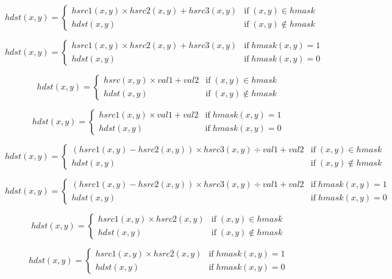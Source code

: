 \documentclass{article}
\begin{document}
{\[ hdst(x,y) = \left\{ \begin{array}{ll} hsrc1(x,y) \times hsrc2(x,y) + hsrc3(x, y) & \mathrm{if} \; (x,y) \in hmask \\ hdst(x,y) & \mathrm{if} \; (x,y) \notin hmask \end{array} \right. \]
\pagebreak

\[hdst(x,y) = \left\{ \begin{array}{ll} hsrc1(x,y) \times hsrc2(x,y) + hsrc3(x, y) & \mathrm{if} \; hmask(x,y) = 1 \\ hdst(x,y) & \mathrm{if} \; hmask(x,y) = 0 \end{array} \right. \]
\pagebreak

\[ hdst(x,y) = \left\{ \begin{array}{ll} hsrc(x,y) \times val1 + val2 & \mathrm{if} \; (x,y) \in hmask \\ hdst(x,y) & \mathrm{if} \; (x,y) \notin hmask \end{array} \right. \]
\pagebreak

\[hdst(x,y) = \left\{ \begin{array}{ll} hsrc1(x,y) \times val1 + val2 & \mathrm{if} \; hmask(x,y) = 1 \\ hdst(x,y) & \mathrm{if} \; hmask(x,y) = 0 \end{array} \right. \]
\pagebreak

\[ hdst(x,y) = \left\{ \begin{array}{ll} ( hsrc1(x,y) - hsrc2(x,y) ) \times hsrc3(x, y) \div val1 + val2 & \mathrm{if} \; (x,y) \in hmask \\ hdst(x,y) & \mathrm{if} \; (x,y) \notin hmask \end{array} \right. \]
\pagebreak

\[hdst(x,y) = \left\{ \begin{array}{ll} ( hsrc1(x,y) - hsrc2(x,y) ) \times hsrc3(x, y) \div val1 + val2 & \mathrm{if} \; hmask(x,y) = 1 \\ hdst(x,y) & \mathrm{if} \; hmask(x,y) = 0 \end{array} \right. \]
\pagebreak

\[ hdst(x,y) = \left\{ \begin{array}{ll} hsrc1(x,y) \times hsrc2(x,y) & \mathrm{if} \; (x,y) \in hmask \\ hdst(x,y) & \mathrm{if} \; (x,y) \notin hmask \end{array} \right. \]
\pagebreak

\[hdst(x,y) = \left\{ \begin{array}{ll} hsrc1(x,y) \times hsrc2(x,y) & \mathrm{if} \; hmask(x,y) = 1 \\ hdst(x,y) & \mathrm{if} \; hmask(x,y) = 0 \end{array} \right. \]
\pagebreak

}
\end{document}
